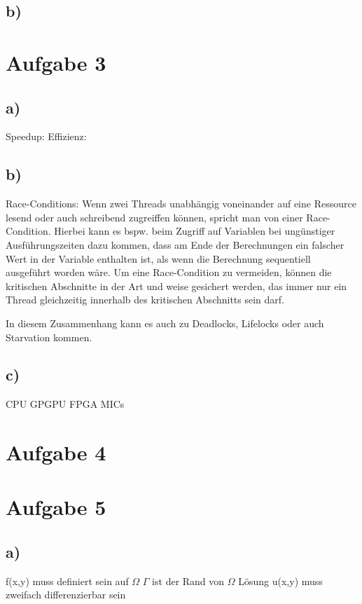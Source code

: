 \documentclass{article}
\begin{document}
	\subsection{b)}

    \section{Aufgabe 3}
        \subsection{a)}
        Speedup:
        Effizienz:
        \subsection{b)}
        Race-Conditions: Wenn zwei Threads unabhängig voneinander auf eine Ressource lesend oder auch schreibend zugreiffen können, 
        spricht man von einer Race-Condition. Hierbei kann es bspw. beim Zugriff auf Variablen bei ungünstiger Ausführungszeiten
        dazu kommen, dass am Ende der Berechnungen ein falscher Wert in der Variable enthalten ist, als wenn die Berechnung sequentiell 
        ausgeführt worden wäre.
        Um eine Race-Condition zu vermeiden, können die kritischen Abschnitte in der Art und weise gesichert werden, das immer nur ein 
        Thread gleichzeitig innerhalb des kritischen Abschnitts sein darf.

        In diesem Zusammenhang kann es auch zu Deadlocks, Lifelocks oder auch Starvation kommen. 
        \subsection{c)}
        CPU
        GPGPU
        FPGA
        MICs

    \section{Aufgabe 4}

    \section{Aufgabe 5}
	\subsection{a)}
	f(x,y) muss definiert sein auf $\Omega$ \newline
	$\Gamma$ ist der Rand von $\Omega$  \newline
	L\"{o}sung u(x,y) muss zweifach differenzierbar sein 
\end{document}
